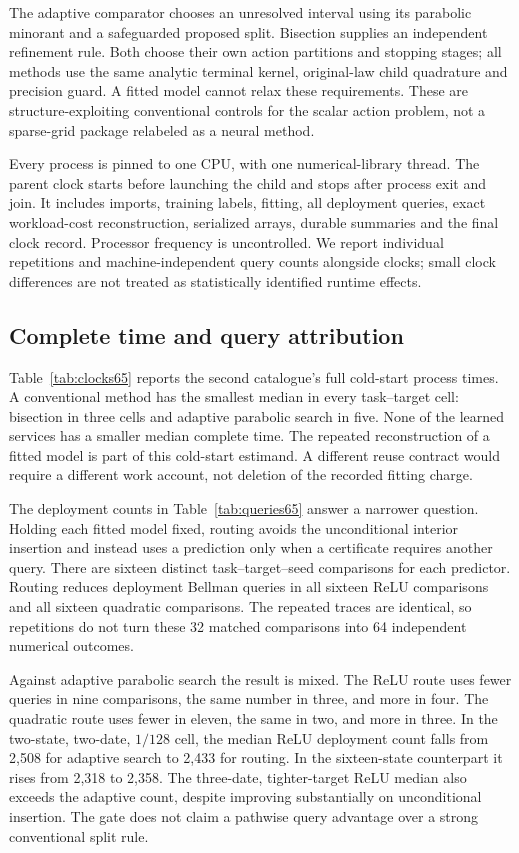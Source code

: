 The adaptive comparator chooses an unresolved interval using its parabolic minorant and a safeguarded proposed split. Bisection supplies an independent refinement rule. Both choose their own action partitions and stopping stages; all methods use the same analytic terminal kernel, original-law child quadrature and precision guard. A fitted model cannot relax these requirements. These are structure-exploiting conventional controls for the scalar action problem, not a sparse-grid package relabeled as a neural method.

Every process is pinned to one CPU, with one numerical-library thread. The parent clock starts before launching the child and stops after process exit and join. It includes imports, training labels, fitting, all deployment queries, exact workload-cost reconstruction, serialized arrays, durable summaries and the final clock record. Processor frequency is uncontrolled. We report individual repetitions and machine-independent query counts alongside clocks; small clock differences are not treated as statistically identified runtime effects.

\subsection{Complete time and query attribution}
Table~\ref{tab:clocks65} reports the second catalogue's full cold-start process times. A conventional method has the smallest median in every task--target cell: bisection in three cells and adaptive parabolic search in five. None of the learned services has a smaller median complete time. The repeated reconstruction of a fitted model is part of this cold-start estimand. A different reuse contract would require a different work account, not deletion of the recorded fitting charge.




The deployment counts in Table~\ref{tab:queries65} answer a narrower question. Holding each fitted model fixed, routing avoids the unconditional interior insertion and instead uses a prediction only when a certificate requires another query. There are sixteen distinct task--target--seed comparisons for each predictor. Routing reduces deployment Bellman queries in all sixteen ReLU comparisons and all sixteen quadratic comparisons. The repeated traces are identical, so repetitions do not turn these 32 matched comparisons into 64 independent numerical outcomes.

Against adaptive parabolic search the result is mixed. The ReLU route uses fewer queries in nine comparisons, the same number in three, and more in four. The quadratic route uses fewer in eleven, the same in two, and more in three. In the two-state, two-date, $1/128$ cell, the median ReLU deployment count falls from 2,508 for adaptive search to 2,433 for routing. In the sixteen-state counterpart it rises from 2,318 to 2,358. The three-date, tighter-target ReLU median also exceeds the adaptive count, despite improving substantially on unconditional insertion. The gate does not claim a pathwise query advantage over a strong conventional split rule.

